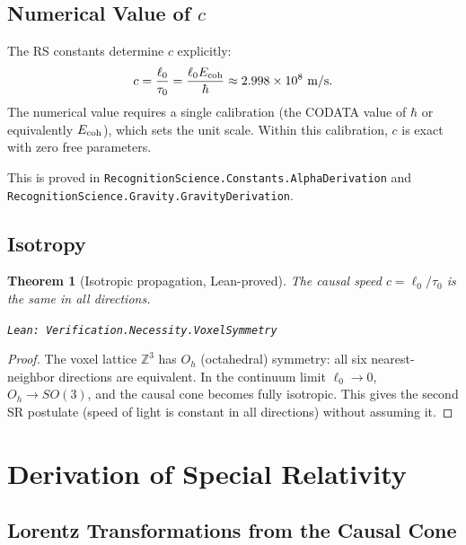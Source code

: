 \documentclass[12pt,a4paper]{article}
\newtheorem{theorem}{Theorem}[section]
\theoremstyle{definition}
\theoremstyle{remark}
\begin{document}
\subsection{Numerical Value of $c$}

The RS constants determine $c$ explicitly:
\begin{equation}
  c = \frac{\ell_0}{\tau_0} = \frac{\ell_0 E_{\rm coh}}{\hbar}
  \approx 2.998 \times 10^8 \text{ m/s}.
\end{equation}
The numerical value requires a single calibration (the CODATA value of
$\hbar$ or equivalently $E_{\rm coh}$), which sets the unit scale.
Within this calibration, $c$ is exact with zero free parameters.

This is proved in \texttt{RecognitionScience.Constants.AlphaDerivation}
and \texttt{RecognitionScience.Gravity.GravityDerivation}.

\subsection{Isotropy}

\begin{theorem}[Isotropic propagation, Lean-proved]\label{thm:iso}
The causal speed $c = \ell_0/\tau_0$ is the same in all directions.

\texttt{Lean: Verification.Necessity.VoxelSymmetry}
\end{theorem}

\begin{proof}
The voxel lattice $\mathbb{Z}^3$ has $O_h$ (octahedral) symmetry: all
six nearest-neighbor directions are equivalent.  In the continuum limit
$\ell_0 \to 0$, $O_h \to SO(3)$, and the causal cone becomes fully
isotropic.  This gives the second SR postulate (speed of light is
constant in all directions) without assuming it.
\end{proof}

\section{Derivation of Special Relativity}
\label{sec:SR}

\subsection{Lorentz Transformations from the Causal Cone}
\end{document}
